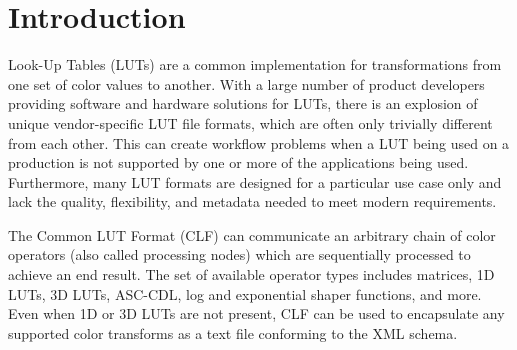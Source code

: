 \unnumberedformat	    %
\chapter{Introduction} 	%

Look-Up Tables (LUTs) are a common implementation for transformations from one set of color values to another. With a large number of product developers providing software and hardware solutions for LUTs, there is an explosion of unique vendor-specific LUT file formats, which are often only trivially different from each other. This can create workflow problems when a LUT being used on a production is not supported by one or more of the applications being used. Furthermore, many LUT formats are designed for a particular use case only and lack the quality, flexibility, and metadata needed to meet modern requirements.

The Common LUT Format (CLF) can communicate an arbitrary chain of color operators (also called processing nodes) which are sequentially processed to achieve an end result. The set of available operator types includes matrices, 1D LUTs, 3D LUTs, ASC-CDL, log and exponential shaper functions, and more. Even when 1D or 3D LUTs are not present, CLF can be used to encapsulate any supported color transforms as a text file conforming to the XML schema.